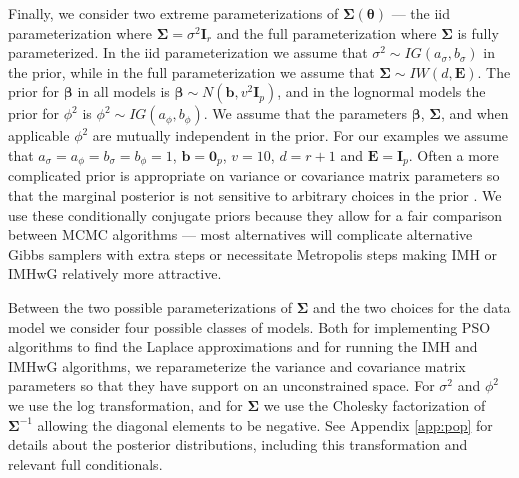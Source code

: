 \documentclass[12pt]{article}
\begin{document}
Finally, we consider two extreme parameterizations of $\bm{\Sigma}(\bm{\theta})$ --- the iid parameterization where $\bm{\Sigma}=\sigma^2\bm{I}_r$ and the full parameterization where $\bm{\Sigma}$ is fully parameterized. In the iid parameterization we assume that $\sigma^2 \sim IG(a_\sigma, b_\sigma)$ in the prior, while in the full parameterization we assume that $\bm{\Sigma}\sim IW(d, \bm{E})$. The prior for $\bm{\beta}$ in all models is $\bm{\beta} \sim N(\bm{b}, v^2\bm{I}_p)$, and in the lognormal models the prior for $\phi^2$ is $\phi^2 \sim IG(a_\phi, b_\phi)$. We assume that the parameters $\bm{\beta}$, $\bm{\Sigma}$, and when applicable $\phi^2$ are mutually independent in the prior. For our examples we assume that $a_\sigma = a_\phi = b_\sigma = b_\phi = 1$, $\bm{b} = \bm{0}_p$, $v = 10$, $d = r + 1$ and $\bm{E} = \bm{I}_p$. Often a more complicated prior is appropriate on variance or covariance matrix parameters so that the marginal posterior is not sensitive to arbitrary choices in the prior \citep{gelman2006prior}. We use these conditionally conjugate priors because they allow for a fair comparison between MCMC algorithms --- most alternatives will complicate alternative Gibbs samplers with extra steps or necessitate Metropolis steps making IMH or IMHwG relatively more attractive.

Between the two possible parameterizations of $\bm{\Sigma}$ and the two choices for the data model we consider four possible classes of models. Both for implementing PSO algorithms to find the Laplace approximations and for running the IMH and IMHwG algorithms, we reparameterize the variance and covariance matrix parameters so that they have support on an unconstrained space. For $\sigma^2$ and $\phi^2$ we use the log transformation, and for $\bm{\Sigma}$ we use the Cholesky factorization of $\bm{\Sigma}^{-1}$ allowing the diagonal elements to be negative. See Appendix \ref{app:pop} for details about the posterior distributions, including this transformation and relevant full conditionals.
\end{document}
